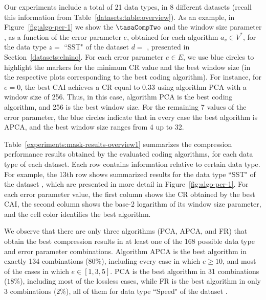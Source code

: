 Our experiments include a total of 21 data types, in 8 different datasets (recall this information from Table~\ref{datasets:table:overview}). As an example, in Figure~\ref{fig:algo-per-1} we show the $\tasaCompTwo$ and the window size parameter \WGlobal, as a function of the error parameter $e$, obtained for each algorithm $a_v \in V^{*}$, for the data type $z=$ ``SST" of the dataset $d=$ \datasetelnino, presented in Section~\ref{datasets:elnino}. For each error parameter $e \in E$, we use blue circles to highlight the markers for the minimum CR value and the best window size (in the respective plots corresponding to the best coding algorithm). For instance, for $e=0$, the best CAI achieves a CR equal to $0.33$ using algorithm PCA with a window size of 256. Thus, in this case, algorithm PCA is the best coding algorithm, and 256 is the best window size. For the remaining 7 values of the error parameter, the blue circles indicate that in every case the best algorithm is APCA, and the best window size ranges from 4 up to 32.


\clearpage




\clearpage


Table~\ref{experiments:mask-results-overview1} summarizes the compression performance results obtained by the evaluated coding algorithms, for each data type of each dataset. Each row contains information relative to certain data type. For example, the 13th row shows summarized results for the data type ``SST" of the dataset \datasetelnino, which are presented in more detail in Figure~\ref{fig:algo-per-1}. For each error parameter value, the first column shows the CR obtained by the best CAI, the second column shows the base-2 logarithm of its window size parameter, and the cell color identifies the best algorithm.
\vspace{+5pt}





We observe that there are only three algorithms (PCA, APCA, and FR) that obtain the best compression results in at least one of the 168 possible data type and error parameter combinations. Algorithm APCA is the best algorithm in exactly 134 combinations ($80\%$), including every case in which $e \geq 10$, and most of the cases in which $e \in [1, 3, 5]$. PCA is the best algorithm in 31 combinations ($18\%$), including most of the lossless cases, while FR is the best algorithm in only 3 combinations ($2\%$), all of them for data type ``Speed" of the dataset \datasetwind.


